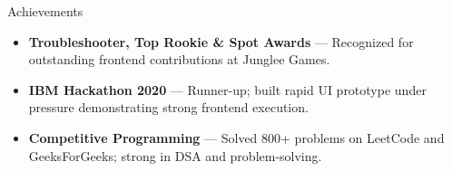 \documentclass{resume}
\begin{document}
\begin{rSection}{Achievements}
\vspace{-3pt}
\begin{itemize}[leftmargin=1em,itemsep=-4pt,topsep=0pt]
    \item \textbf{Troubleshooter, Top Rookie \& Spot Awards} --- Recognized for outstanding frontend contributions at Junglee Games.
    \item \textbf{IBM Hackathon 2020} --- Runner-up; built rapid UI prototype under pressure demonstrating strong frontend execution.
    \item \textbf{Competitive Programming} --- Solved 800+ problems on LeetCode and GeeksForGeeks; strong in DSA and problem-solving.
\end{itemize}
\end{rSection}
\end{document}
